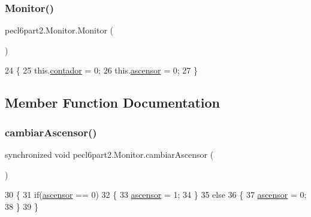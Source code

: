\subsubsection{\texorpdfstring{Monitor()}{Monitor()}}
{\footnotesize\ttfamily pecl6part2.\+Monitor.\+Monitor (\begin{DoxyParamCaption}{ }\end{DoxyParamCaption})\hspace{0.3cm}{\ttfamily [inline]}}


\begin{DoxyCode}
24     \{
25         this.\mbox{\hyperlink{classpecl6part2_1_1_monitor_a0d9c747a36ef376665ed43b257c623ad}{contador}} = 0;
26         this.\mbox{\hyperlink{classpecl6part2_1_1_monitor_abfc1bfd2de962ac64f1c505d9dbe136a}{ascensor}} = 0;
27     \}
\end{DoxyCode}


\subsection{Member Function Documentation}
\mbox{\label{classpecl6part2_1_1_monitor_aba7c54d3f7bb8f4e19bcec5d7f8dcb76}} 
\subsubsection{\texorpdfstring{cambiar\+Ascensor()}{cambiarAscensor()}}
{\footnotesize\ttfamily synchronized void pecl6part2.\+Monitor.\+cambiar\+Ascensor (\begin{DoxyParamCaption}{ }\end{DoxyParamCaption})\hspace{0.3cm}{\ttfamily [inline]}}


\begin{DoxyCode}
30     \{
31         \textcolor{keywordflow}{if}(\mbox{\hyperlink{classpecl6part2_1_1_monitor_abfc1bfd2de962ac64f1c505d9dbe136a}{ascensor}} == 0)
32         \{
33             \mbox{\hyperlink{classpecl6part2_1_1_monitor_abfc1bfd2de962ac64f1c505d9dbe136a}{ascensor}} = 1;
34         \}
35         \textcolor{keywordflow}{else}
36         \{
37             \mbox{\hyperlink{classpecl6part2_1_1_monitor_abfc1bfd2de962ac64f1c505d9dbe136a}{ascensor}} = 0;
38         \}
39     \}
\end{DoxyCode}
\mbox{\label{classpecl6part2_1_1_monitor_aaf66683271f65268b7d18799972819e0}} 
